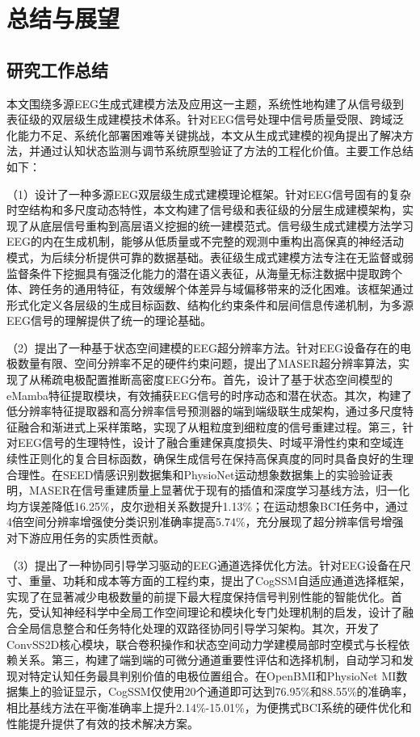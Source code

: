 \chapter{总结与展望}

\section{研究工作总结}

本文围绕多源EEG生成式建模方法及应用这一主题，系统性地构建了从信号级到表征级的双层级生成建模技术体系。针对EEG信号处理中信号质量受限、跨域泛化能力不足、系统化部署困难等关键挑战，本文从生成式建模的视角提出了解决方法，并通过认知状态监测与调节系统原型验证了方法的工程化价值。主要工作总结如下：

（1）设计了一种多源EEG双层级生成式建模理论框架。针对EEG信号固有的复杂时空结构和多尺度动态特性，本文构建了信号级和表征级的分层生成建模架构，实现了从底层信号重构到高层语义挖掘的统一建模范式。信号级生成式建模方法学习EEG的内在生成机制，能够从低质量或不完整的观测中重构出高保真的神经活动模式，为后续分析提供可靠的数据基础。表征级生成式建模方法专注在无监督或弱监督条件下挖掘具有强泛化能力的潜在语义表征，从海量无标注数据中提取跨个体、跨任务的通用特征，有效缓解个体差异与域偏移带来的泛化困难。该框架通过形式化定义各层级的生成目标函数、结构化约束条件和层间信息传递机制，为多源EEG信号的理解提供了统一的理论基础。

（2）提出了一种基于状态空间建模的EEG超分辨率方法。针对EEG设备存在的电极数量有限、空间分辨率不足的硬件约束问题，提出了MASER超分辨率算法，实现了从稀疏电极配置推断高密度EEG分布。首先，设计了基于状态空间模型的eMamba特征提取模块，有效捕获EEG信号的时序动态和潜在状态。其次，构建了低分辨率特征提取器和高分辨率信号预测器的端到端级联生成架构，通过多尺度特征融合和渐进式上采样策略，实现了从粗粒度到细粒度的信号重建过程。第三，针对EEG信号的生理特性，设计了融合重建保真度损失、时域平滑性约束和空域连续性正则化的复合目标函数，确保生成信号在保持高保真度的同时具备良好的生理合理性。在SEED情感识别数据集和PhysioNet运动想象数据集上的实验验证表明，MASER在信号重建质量上显著优于现有的插值和深度学习基线方法，归一化均方误差降低16.25\%，皮尔逊相关系数提升1.13\%；在运动想象BCI任务中，通过4倍空间分辨率增强使分类识别准确率提高5.74\%，充分展现了超分辨率信号增强对下游应用任务的实质性贡献。

（3）提出了一种协同引导学习驱动的EEG通道选择优化方法。针对EEG设备在尺寸、重量、功耗和成本等方面的工程约束，提出了CogSSM自适应通道选择框架，实现了在显著减少电极数量的前提下最大程度保持信号判别性能的智能优化。首先，受认知神经科学中全局工作空间理论和模块化专门处理机制的启发，设计了融合全局信息整合和任务特化处理的双路径协同引导学习架构。其次，开发了ConvSS2D核心模块，联合卷积操作和状态空间动力学建模局部时空模式与长程依赖关系。第三，构建了端到端的可微分通道重要性评估和选择机制，自动学习和发现对特定认知任务最具判别价值的电极位置组合。在OpenBMI和PhysioNet MI数据集上的验证显示，CogSSM仅使用20个通道即可达到76.95\%和88.55\%的准确率，相比基线方法在平衡准确率上提升2.14\%-15.01\%，为便携式BCI系统的硬件优化和性能提升提供了有效的技术解决方案。

